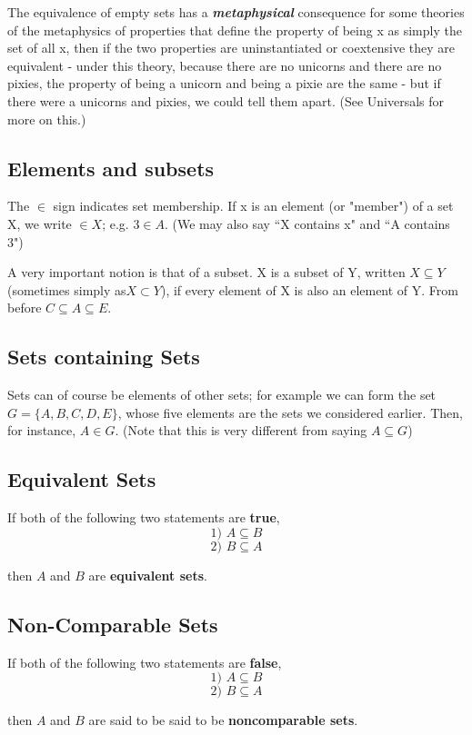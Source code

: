 \documentclass[12pt]{article}
\begin{document}
The equivalence of empty sets has a \textbf{\textit{metaphysical}} consequence for some theories of the metaphysics of properties that define the property of being x as simply the set of all x, then if the two properties are uninstantiated or coextensive they are equivalent - under this theory, because there are no unicorns and there are no pixies, the property of being a unicorn and being a pixie are the same - but if there were a unicorns and pixies, we could tell them apart. (See Universals for more on this.)

\subsection*{Elements and subsets}

The $\in$  sign indicates set membership. If x is an element (or "member") of a set X, we write $ \in X$; e.g. $3\in A$. (We may also say ``X contains x" and ``A contains 3")

A very important notion is that of a subset. X is a subset of Y, written $X \subseteq Y$ (sometimes simply as$X \subset Y$), if every element of X is also an element of Y. From before $C\subseteq A \subseteq E$.


\subsection*{Sets containing Sets}


Sets can of course be elements of other sets; for example we can form the set $G = \{A,B,C,D,E\}$, whose five elements are the sets we considered earlier. Then, for instance, $A\in G$. (Note that this is very different from saying $A\subseteq G$)



\subsection{Equivalent Sets}
If both of the following two statements are \textbf{true}, 
\[\mbox{1)  } A \subseteq B \]
\[\mbox{2)  } B \subseteq A \]

then $A$ and $B$ are \textbf{equivalent sets}.



\subsection*{Non-Comparable Sets}
If both of the following two statements are \textbf{false}, 
\[\mbox{1)  } A \subseteq B \]
\[\mbox{2)  } B \subseteq A \]

then $A$ and $B$ are said to be said to be \textbf{noncomparable sets}.



\end{document}
